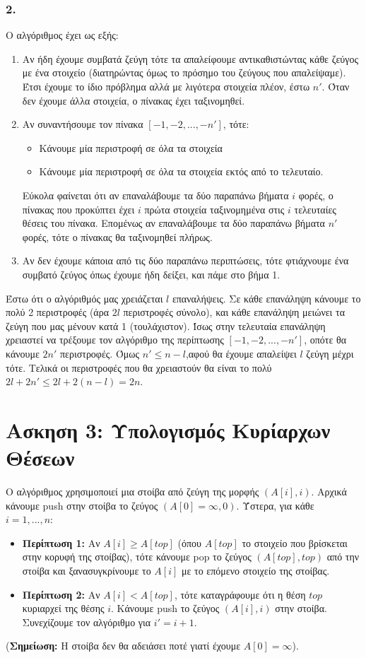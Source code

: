 			\subsubsection*{2.}
				Ο αλγόριθμος έχει ως εξής:
				\begin{enumerate}
					\item Αν ήδη έχουμε συμβατά ζεύγη τότε τα απαλείφουμε αντικαθιστώντας κάθε ζεύγος με ένα στοιχείο (διατηρώντας όμως το πρόσημο του ζεύγους που απαλείψαμε). Έτσι έχουμε το ίδιο πρόβλημα αλλά με λιγότερα στοιχεία πλέον, έστω $n'$. Όταν δεν έχουμε άλλα στοιχεία, ο πίνακας έχει ταξινομηθεί.
					\item Αν συναντήσουμε τον πίνακα $[-1,-2,...,-n']$, τότε:
						\begin{itemize}
							\item Κάνουμε μία περιστροφή σε όλα τα στοιχεία
							\item Κάνουμε μία περιστροφή σε όλα τα στοιχεία εκτός από το τελευταίο.
						\end{itemize}
						Εύκολα φαίνεται ότι αν επαναλάβουμε τα δύο παραπάνω βήματα $i$ φορές, ο πίνακας που προκύπτει έχει $i$ πρώτα στοιχεία ταξινομημένα στις $i$ τελευταίες θέσεις του πίνακα. Επομένως αν επαναλάβουμε τα δύο παραπάνω βήματα $n'$ φορές, τότε ο πίνακας θα ταξινομηθεί πλήρως.
					\item Αν δεν έχουμε κάποια από τις δύο παραπάνω περιπτώσεις, τότε φτιάχνουμε ένα συμβατό ζεύγος όπως έχουμε ήδη δείξει, και πάμε στο βήμα 1.
				\end{enumerate}
			
				Έστω ότι ο αλγόριθμός μας χρειάζεται $l$ επαναλήψεις. Σε κάθε επανάληψη κάνουμε το πολύ 2 περιστροφές (άρα $2l$ περιστροφές σύνολο), και κάθε επανάληψη μειώνει τα ζεύγη που μας μένουν κατά 1 (τουλάχιστον). Ίσως στην τελευταία επανάληψη χρειαστεί να τρέξουμε τον αλγόριθμο της περίπτωσης $[-1,-2,...,-n']$, οπότε θα κάνουμε $2n'$ περιστροφές. Όμως $n'\leq n-l$,αφού θα έχουμε απαλείψει $l$ ζεύγη μέχρι τότε. Τελικά οι περιστροφές που θα χρειαστούν θα είναι το πολύ $2l+2n' \leq 2l+2(n-l) = 2n$.
				
	\section*{Ασκηση 3: Υπολογισμός Κυρίαρχων Θέσεων}
		Ο αλγόριθμος χρησιμοποιεί μια στοίβα από ζεύγη της μορφής $(A[i], i)$. Αρχικά κάνουμε push στην στοίβα το ζεύγος $(Α[0]=\infty, 0)$. Ύστερα, για κάθε $i = 1, ..., n$: \\
		\begin{itemize}
			\item \textbf{Περίπτωση 1:} Αν $A[i] \geq A[top]$ (όπου $A[top]$ το στοιχείο που βρίσκεται στην κορυφή της στοίβας), τότε κάνουμε pop το ζεύγος $(Α[top], top)$ από την στοίβα και ξανασυγκρίνουμε το $A[i]$ με το επόμενο στοιχείο της στοίβας.
			\item \textbf{Περίπτωση 2:} Αν $Α[i] < A[top]$, τότε καταγράφουμε ότι η θέση $top$ κυριαρχεί της θέσης $i$. Κάνουμε push το ζεύγος $(A[i], i)$ στην στοίβα. Συνεχίζουμε τον αλγόριθμο για $i'=i+1$.     
		\end{itemize} 
		(\textbf{Σημείωση:} Η στοίβα δεν θα αδειάσει ποτέ γιατί έχουμε $A[0] = \infty$). \\
		
